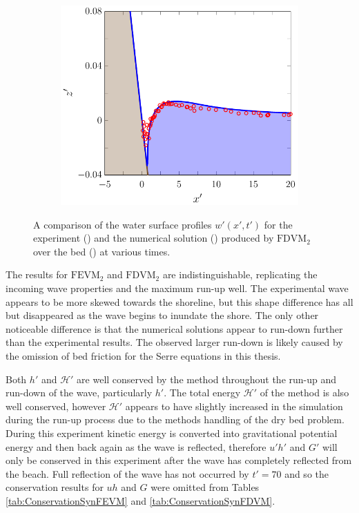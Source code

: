 \begin{figure}
\begin{subfigure}{0.5\textwidth}
		\vspace{0.5cm}
	\end{subfigure}
	\begin{subfigure}{0.5\textwidth}
		\includegraphics[width=\textwidth]{./chp6/figures/Experiment/Synolakis/H0p0185/FDVM/70s.pdf}
		\vspace{0.5cm}
	\end{subfigure}
	\caption{A comparison of the water surface profiles $w'(x',t')$ for the experiment () and the numerical solution () produced by $\text{FDVM}_2$ over the bed () at various times.}
	\label{fig:SynolakisFDVMNoBreak}
\end{figure}

The results for $\text{FEVM}_2$ and $\text{FDVM}_2$ are indistinguishable, replicating the incoming wave properties and the maximum run-up well. The experimental wave appears to be more skewed towards the shoreline, but this shape difference has all but disappeared as the wave begins to inundate the shore. The only other noticeable difference is that the numerical solutions appear to run-down further than the experimental results. The observed larger run-down is likely caused by the omission of bed friction for the Serre equations in this thesis.

Both $h'$ and $\mathcal{H}'$ are well conserved by the method throughout the run-up and run-down of the wave, particularly $h'$. The total energy $\mathcal{H}'$ of the method is also well conserved, however $\mathcal{H}'$ appears to have slightly increased in the simulation during the run-up process due to the methods handling of the dry bed problem. During this experiment kinetic energy is converted into gravitational potential energy and then back again as the wave is reflected, therefore $u'h'$ and $G'$ will only be conserved in this experiment after the wave has completely reflected from the beach. Full reflection of the wave has not occurred by $t'=70$ and so the conservation results for $uh$ and $G$ were omitted from Tables \ref{tab:ConservationSynFEVM} and \ref{tab:ConservationSynFDVM}.

